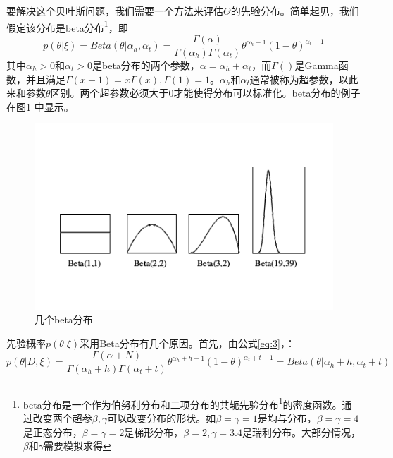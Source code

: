 \documentclass[10pt,a4paper]{article}
\begin{document}
\begin{CJK*}{UTF8}{gkai}
要解决这个贝叶斯问题，我们需要一个方法来评估$\Theta$的先验分布。简单起见，我们假定该分布是beta分布\footnote{beta分布是一个作为伯努利分布和二项分布的共轭先验分布\footnote{共轭分布：在贝叶斯理论里，如果后验分布$p(\theta|D,\xi)$和先验分布$p(\theta|\xi)$是同一类型的分布函数（比如指数族），那么这先验概率和后验概率叫共轭分布。先验概率分布叫似然函数的共轭先验。}的密度函数。通过改变两个超参$\beta,\gamma$可以改变分布的形状。如$\beta=\gamma=1$是均与分布，$\beta=\gamma=4$是正态分布，$\beta=\gamma=2$是梯形分布，$\beta=2,\gamma=3.4$是瑞利分布。大部分情况，$\beta$和$\gamma$需要模拟求得}，即
\begin{equation}
p(\theta|\xi)=Beta(\theta|\alpha_h,\alpha_t)
=\frac{\Gamma(\alpha)}{\Gamma(\alpha_h)\Gamma(\alpha_t)}\theta^{\alpha_h-1}(1-\theta)^{\alpha_t-1}
\end{equation}
其中$\alpha_h > 0$和$\alpha_t > 0$是beta分布的两个参数，$\alpha = \alpha_h+\alpha_t$，而$\Gamma()$是Gamma函数，并且满足$\Gamma(x+1)=x\Gamma(x),\Gamma(1)=1$。$\alpha_h$和$\alpha_t$通常被称为超参数，以此来和参数$\theta$区别。两个超参数必须大于0才能使得分布可以标准化。beta分布的例子在图\ref{fig:beta} 中显示。
\begin{figure}[!htbp]
	\centering
    	\includegraphics[scale=0.4]{figs/beta.png}
	\caption{几个beta分布}    
	\label{fig:beta}
\end{figure}


先验概率$p(\theta|\xi)$采用Beta分布有几个原因。首先，由公式\ref{eq:3}，：
\begin{equation}
\label{eq:6}
p(\theta|D,\xi)
=\frac{\Gamma(\alpha+N)}{\Gamma(\alpha_h+h)\Gamma(\alpha_t+t)}\theta^{\alpha_h+h-1}(1-\theta)^{\alpha_t+t-1}
=Beta(\theta|\alpha_h+h,\alpha_t+t)
\end{equation}


\end{CJK*}
\end{document}
